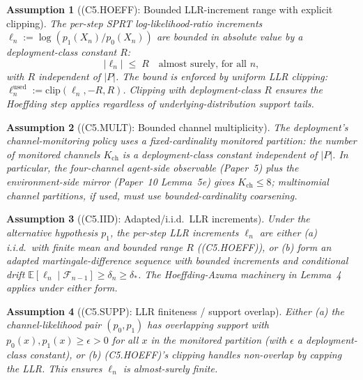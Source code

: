 \documentclass{article}
\newtheorem{assumption}{Assumption}
\newcommand{\deltastar}{\delta_{*}}
\begin{document}
\begin{assumption}[(C5.HOEFF): Bounded LLR-increment range with explicit clipping]
\label{ass:C5HOEFF}
The per-step SPRT log-likelihood-ratio increments
$\ell_n := \log(p_1(X_n)/p_0(X_n))$ are bounded in absolute value
by a deployment-class constant $R$:
\[
  |\ell_n| \;\leq\; R \quad \text{almost surely, for all } n,
\]
with $R$ independent of $|P|$.  The bound is enforced by uniform
LLR clipping: $\ell_n^{\mathrm{used}} := \mathrm{clip}(\ell_n, -R, R)$.
Clipping with deployment-class $R$ ensures the Hoeffding step
applies regardless of underlying-distribution support tails.
\end{assumption}

\begin{assumption}[(C5.MULT): Bounded channel multiplicity]
\label{ass:C5MULT}
The deployment's channel-monitoring policy uses a fixed-cardinality
monitored partition: the number of monitored channels $K_{\mathrm{ch}}$
is a deployment-class constant independent of $|P|$.  In particular,
the four-channel agent-side observable (Paper~5) plus the
environment-side mirror (Paper~10 Lemma~5e) gives
$K_{\mathrm{ch}} \leq 8$; multinomial channel partitions, if used,
must use bounded-cardinality coarsening.
\end{assumption}

\begin{assumption}[(C5.IID): Adapted/i.i.d.\ LLR increments]
\label{ass:C5IID}
Under the alternative hypothesis $p_1$, the per-step LLR increments
$\ell_n$ are either (a) i.i.d.\ with finite mean and bounded range
$R$ ((C5.HOEFF)), or (b) form an adapted martingale-difference
sequence with bounded increments and conditional drift
$\mathbb{E}[\ell_n \mid \mathcal{F}_{n-1}] \geq \delta_n \geq
\deltastar$.  The Hoeffding-Azuma machinery in Lemma~4 applies
under either form.
\end{assumption}

\begin{assumption}[(C5.SUPP): LLR finiteness / support overlap]
\label{ass:C5SUPP}
Either (a) the channel-likelihood pair $(p_0, p_1)$ has overlapping
support with $p_0(x), p_1(x) \geq \epsilon > 0$ for all $x$ in the
monitored partition (with $\epsilon$ a deployment-class constant), or
(b) (C5.HOEFF)'s clipping handles non-overlap by capping the LLR.
This ensures $\ell_n$ is almost-surely finite.
\end{assumption}
\end{document}
